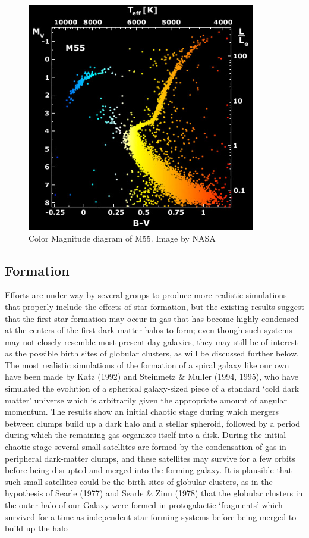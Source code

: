 \begin{figure}[H]
\centering
\includegraphics[width=10cm]{images/m55_diagram.jpg}
\caption{Color Magnitude diagram of M55. Image by NASA}
\end{figure}

\subsection{Formation}



Efforts are under way by several groups to produce more realistic simulations that properly include the effects
of star formation, but the existing results suggest that the first star formation may occur in gas that has become highly condensed at the centers of the first dark-matter halos to form; even though such systems may not closely resemble most present-day galaxies, they may still be of interest as the possible birth sites
of globular clusters, as will be discussed further below. The most realistic simulations of the formation of a spiral galaxy like our own have been made by Katz (1992) and Steinmetz \& Muller (1994, 1995), who have simulated the evolution of a spherical galaxy-sized piece of a standard ‘cold dark matter’ universe which is arbitrarily given the appropriate amount of angular momentum. The results show an initial chaotic stage during which mergers between clumps build up a dark halo and a stellar spheroid, followed by a period during which the remaining gas organizes itself into a disk. During the initial chaotic stage several small satellites are formed by the condensation of gas in peripheral dark-matter clumps, and these satellites may survive for a few
orbits before being disrupted and merged into the forming galaxy. It is plausible that such small satellites could be the birth sites of globular clusters, as in the hypothesis of Searle (1977) and Searle \& Zinn (1978) that the globular clusters in the outer halo of our Galaxy were formed in protogalactic ‘fragments’ which
survived for a time as independent star-forming systems before being merged to build up the halo

